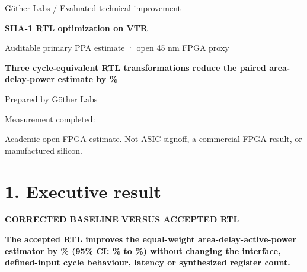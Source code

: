 \documentclass[10pt,a4paper]{article}
\newcommand{\smallcaps}[1]{\textcolor{Mid}{\fontsize{8.5}{10}\selectfont\bfseries\MakeUppercase{#1}}}
\newcommand{\newpageheading}[2]{\clearpage\section{#1}\smallcaps{#2}\vspace{6pt}}
\begin{document}
\thispagestyle{empty}
\vspace*{47mm}
{\color{Mid}\fontsize{11}{14}\selectfont Göther Labs / Evaluated technical improvement}\par
\vspace{5mm}
{\color{Ink}\fontsize{29}{33}\selectfont\bfseries SHA-1 RTL optimization on VTR}\par
\vspace{5mm}
{\color{Mid}\fontsize{13}{16}\selectfont Auditable primary PPA estimate · open 45 nm FPGA proxy}\par
\vspace{19mm}
\begin{claimbox}
{\fontsize{15}{19}\selectfont\bfseries Three cycle-equivalent RTL transformations reduce the paired area-delay-power estimate by \CompositeEstimate\%}
\end{claimbox}
\vspace{35mm}
{\color{Mid}\fontsize{12}{15}\selectfont Prepared by Göther Labs}\par
\vspace{4mm}
{\color{Mid}\fontsize{12}{15}\selectfont Measurement completed: \EvidenceDate}\par
\vfill
{\color{Mid}\footnotesize Academic open-FPGA estimate. Not ASIC signoff, a commercial FPGA result, or manufactured silicon.}\par

\newpageheading{1. Executive result}{Corrected baseline versus accepted RTL}

\begin{claimbox}
\textbf{The accepted RTL improves the equal-weight area-delay-active-power estimator by \CompositeEstimate\% (95\% CI: \CompositeLow\% to \CompositeHigh\%) without changing the interface, defined-input cycle behaviour, latency or synthesized register count.}
\end{claimbox}
\end{document}
